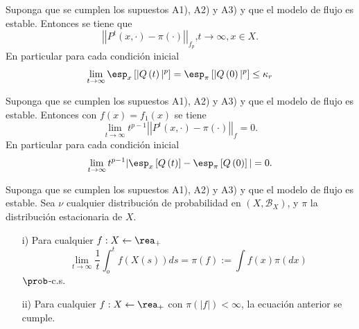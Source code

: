\begin{Teo}\label{Tma.6.2}
Suponga que se cumplen los supuestos A1), A2) y A3) y que el
modelo de flujo es estable. Entonces se tiene que
\begin{equation}
|\left|P^{t}\left(x,\cdot\right)-\pi\left(\cdot\right)\right||_{f_{p}}\textrm{,
}t\rightarrow\infty,x\in X.
\end{equation}
En particular para cada condici\'on inicial
\begin{eqnarray*}
\lim_{t\rightarrow\infty}\esp_{x}\left[|Q\left(t\right)|^{p}\right]=\esp_{\pi}\left[|Q\left(0\right)|^{p}\right]\leq\kappa_{r}
\end{eqnarray*}
\end{Teo}
\begin{Teo}\label{Tma.6.3}
Suponga que se cumplen los supuestos A1), A2) y A3) y que el
modelo de flujo es estable. Entonces con
$f\left(x\right)=f_{1}\left(x\right)$ se tiene
\begin{equation}
\lim_{t\rightarrow\infty}t^{p-1}|\left|P^{t}\left(x,\cdot\right)-\pi\left(\cdot\right)\right||_{f}=0.
\end{equation}
En particular para cada condici\'on inicial
\begin{eqnarray*}
\lim_{t\rightarrow\infty}t^{p-1}|\esp_{x}\left[Q\left(t\right)\right]-\esp_{\pi}\left[Q\left(0\right)\right]|=0.
\end{eqnarray*}
\end{Teo}

\begin{Teo}\label{Tma.6.4}
Suponga que se cumplen los supuestos A1), A2) y A3) y que el
modelo de flujo es estable. Sea $\nu$ cualquier distribuci\'on de
probabilidad en $\left(X,\mathcal{B}_{X}\right)$, y $\pi$ la
distribuci\'on estacionaria de $X$.
\begin{itemize}
\item[i)] Para cualquier $f:X\leftarrow\rea_{+}$
\begin{equation}
\lim_{t\rightarrow\infty}\frac{1}{t}\int_{o}^{t}f\left(X\left(s\right)\right)ds=\pi\left(f\right):=\int
f\left(x\right)\pi\left(dx\right)
\end{equation}
$\prob$-c.s. \item[ii)] Para cualquier $f:X\leftarrow\rea_{+}$ con
$\pi\left(|f|\right)<\infty$, la ecuaci\'on anterior se cumple.
\end{itemize}
\end{Teo}

%
